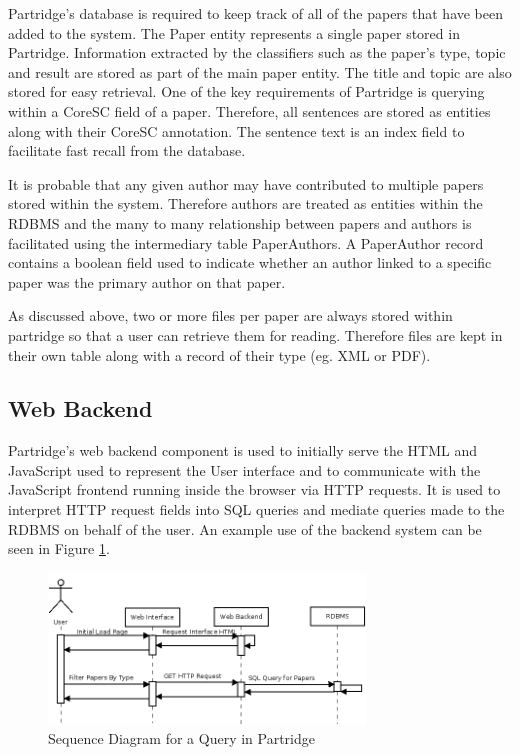 Partridge's database is required to keep track of all of the papers that have
been added to the system. The Paper entity represents a single paper stored in
Partridge. Information extracted by the classifiers such as the paper's type,
topic and result are stored as part of the main paper entity. The title and
topic are also stored for easy retrieval. One of the key requirements of
Partridge is querying within a CoreSC field of a paper. Therefore, all
sentences are stored as entities along with their CoreSC annotation. The sentence
text is an index field to facilitate fast recall from the database.

It is probable that any given author may have contributed to multiple papers
stored within the system.  Therefore authors are treated as entities within the
RDBMS and the many to many relationship between papers and authors is
facilitated using the intermediary table PaperAuthors. A PaperAuthor record
contains a boolean field used to indicate whether an author linked to a
specific paper was the primary author on that paper.

As discussed above, two or more files per paper are always stored within
partridge so that a user can retrieve them for reading. Therefore files are
kept in their own table along with a record of their type (eg. XML or PDF). 

\subsection{ Web Backend }

Partridge's web backend component is used to initially serve the HTML and
JavaScript used to represent the User interface and to communicate with the
JavaScript frontend running inside the browser via HTTP requests. It is used to
interpret HTTP request fields into SQL queries and mediate queries made to the
RDBMS on behalf of the user. An example use of the backend system can be seen
in Figure \ref{fig:backend_sequence}.

\begin{figure}[!ht]
\centering
\includegraphics[width=0.75\textwidth]{images/design/backend_sequence.png}
\caption{Sequence Diagram for a Query in Partridge}
\label{fig:backend_sequence}
\end{figure}

